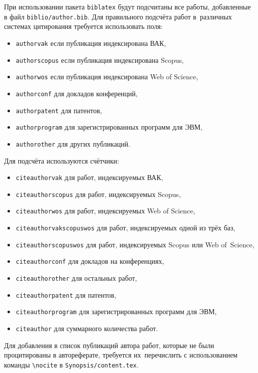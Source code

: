 При использовании пакета \verb!biblatex! будут подсчитаны все работы, добавленные
в файл \verb!biblio/author.bib!. Для правильного подсчёта работ в~различных
системах цитирования требуется использовать поля:
\begin{itemize}
        \item \texttt{authorvak} если публикация индексирована ВАК,
        \item \texttt{authorscopus} если публикация индексирована Scopus,
        \item \texttt{authorwos} если публикация индексирована Web of Science,
        \item \texttt{authorconf} для докладов конференций,
        \item \texttt{authorpatent} для патентов,
        \item \texttt{authorprogram} для зарегистрированных программ для ЭВМ,
        \item \texttt{authorother} для других публикаций.
\end{itemize}
Для подсчёта используются счётчики:
\begin{itemize}
        \item \texttt{citeauthorvak} для работ, индексируемых ВАК,
        \item \texttt{citeauthorscopus} для работ, индексируемых Scopus,
        \item \texttt{citeauthorwos} для работ, индексируемых Web of Science,
        \item \texttt{citeauthorvakscopuswos} для работ, индексируемых одной из трёх баз,
        \item \texttt{citeauthorscopuswos} для работ, индексируемых Scopus или Web of~Science,
        \item \texttt{citeauthorconf} для докладов на конференциях,
        \item \texttt{citeauthorother} для остальных работ,
        \item \texttt{citeauthorpatent} для патентов,
        \item \texttt{citeauthorprogram} для зарегистрированных программ для ЭВМ,
        \item \texttt{citeauthor} для суммарного количества работ.
\end{itemize}

Для добавления в список публикаций автора работ, которые не были процитированы в
автореферате, требуется их~перечислить с использованием команды \verb!\nocite! в
\verb!Synopsis/content.tex!.
